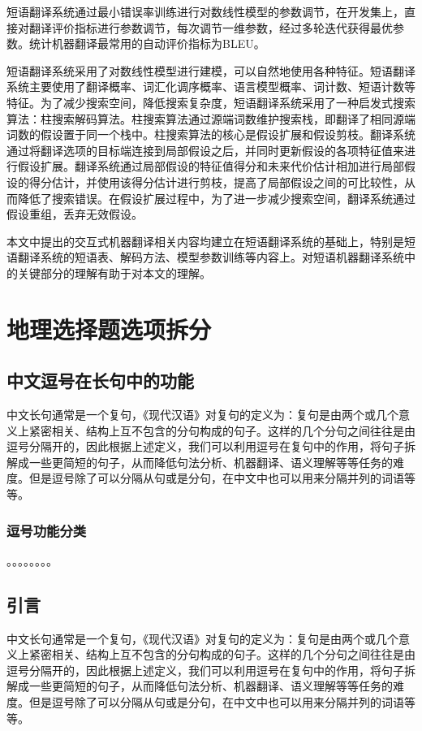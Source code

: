 \documentclass[master, winfont]{njuthesis}
\begin{document}
短语翻译系统通过最小错误率训练进行对数线性模型的参数调节，在开发集上，直接对翻译评价指标进行参数调节，每次调节一维参数，经过多轮迭代获得最优参数。统计机器翻译最常用的自动评价指标为BLEU。

短语翻译系统采用了对数线性模型进行建模，可以自然地使用各种特征。短语翻译系统主要使用了翻译概率、词汇化调序概率、语言模型概率、词计数、短语计数等特征。为了减少搜索空间，降低搜索复杂度，短语翻译系统采用了一种启发式搜索算法：柱搜索解码算法。柱搜索算法通过源端词数维护搜索栈，即翻译了相同源端词数的假设置于同一个栈中。柱搜索算法的核心是假设扩展和假设剪枝。翻译系统通过将翻译选项的目标端连接到局部假设之后，并同时更新假设的各项特征值来进行假设扩展。翻译系统通过局部假设的特征值得分和未来代价估计相加进行局部假设的得分估计，并使用该得分估计进行剪枝，提高了局部假设之间的可比较性，从而降低了搜索错误。在假设扩展过程中，为了进一步减少搜索空间，翻译系统通过假设重组，丢弃无效假设。

本文中提出的交互式机器翻译相关内容均建立在短语翻译系统的基础上，特别是短语翻译系统的短语表、解码方法、模型参数训练等内容上。对短语机器翻译系统中的关键部分的理解有助于对本文的理解。

\chapter{地理选择题选项拆分}
\section{中文逗号在长句中的功能}\label{section:modeling}
中文长句通常是一个复句，《现代汉语》对复句的定义为：复句是由两个或几个意义上紧密相关、结构上互不包含的分句构成的句子\cite{zhou2008}。这样的几个分句之间往往是由逗号分隔开的，因此根据上述定义，我们可以利用逗号在复句中的作用，将句子拆解成一些更简短的句子，从而降低句法分析、机器翻译、语义理解等等任务的难度。但是逗号除了可以分隔从句或是分句，在中文中也可以用来分隔并列的词语等等。

\subsection{逗号功能分类}
。。。。。。。。
\section{引言}
中文长句通常是一个复句，《现代汉语》对复句的定义为：复句是由两个或几个意义上紧密相关、结构上互不包含的分句构成的句子\cite{zhou2008}。这样的几个分句之间往往是由逗号分隔开的，因此根据上述定义，我们可以利用逗号在复句中的作用，将句子拆解成一些更简短的句子，从而降低句法分析、机器翻译、语义理解等等任务的难度。但是逗号除了可以分隔从句或是分句，在中文中也可以用来分隔并列的词语等等。
\end{document}
